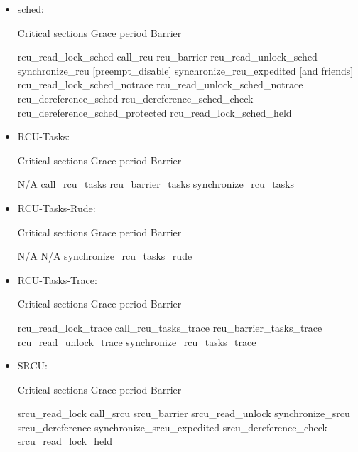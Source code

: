 \begin{itemize}
\item sched:

\begin{VerbatimU}[tabsize=1]
	Critical sections       Grace period             Barrier

	rcu_read_lock_sched     call_rcu                 rcu_barrier
	rcu_read_unlock_sched   synchronize_rcu
	[preempt_disable]       synchronize_rcu_expedited
	[and friends]
	rcu_read_lock_sched_notrace
	rcu_read_unlock_sched_notrace
	rcu_dereference_sched
	rcu_dereference_sched_check
	rcu_dereference_sched_protected
	rcu_read_lock_sched_held
\end{VerbatimU}

\item RCU-Tasks:

\begin{VerbatimU}[tabsize=1]
	Critical sections       Grace period             Barrier

	N/A                     call_rcu_tasks           rcu_barrier_tasks
	                        synchronize_rcu_tasks
\end{VerbatimU}

\item RCU-Tasks-Rude:

\begin{VerbatimU}[tabsize=1]
	Critical sections       Grace period            Barrier

	N/A                                             N/A
	                        synchronize_rcu_tasks_rude
\end{VerbatimU}

\item RCU-Tasks-Trace:

\begin{VerbatimU}[tabsize=1,gobble=1]
	Critical sections      Grace period          Barrier

	rcu_read_lock_trace    call_rcu_tasks_trace  rcu_barrier_tasks_trace
	rcu_read_unlock_trace  synchronize_rcu_tasks_trace
\end{VerbatimU}

\item SRCU\@:

\begin{VerbatimU}[tabsize=1]
	Critical sections       Grace period            Barrier

	srcu_read_lock          call_srcu               srcu_barrier
	srcu_read_unlock        synchronize_srcu
	srcu_dereference        synchronize_srcu_expedited
	srcu_dereference_check
	srcu_read_lock_held
\end{VerbatimU}


\end{itemize}
